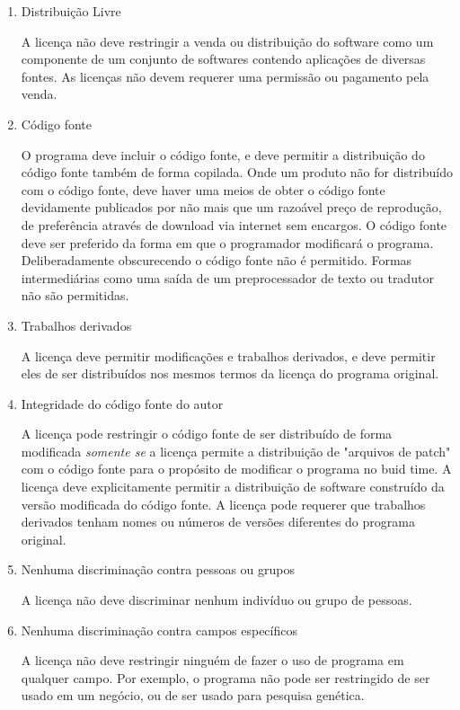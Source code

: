 \documentclass[12pt, a4paper]{report}
\begin{document}
\begin{enumerate}

  \item{Distribuição Livre}

    A licença não deve restringir a venda ou distribuição do software como um componente de um conjunto de softwares contendo aplicações de diversas fontes. As licenças não devem requerer uma permissão ou pagamento pela venda.

  \item{Código fonte}

    O programa deve incluir o código fonte, e deve permitir a distribuição do código fonte também de forma copilada. Onde um produto não for distribuído com o código fonte, deve haver uma meios de obter o código fonte devidamente publicados por não mais que um razoável preço de reprodução, de preferência através de download via internet sem encargos. O código fonte deve ser preferido da forma em que o programador modificará o programa. Deliberadamente obscurecendo o código fonte não é permitido. Formas intermediárias como uma saída de um preprocessador de texto ou tradutor não são permitidas.

  \item{Trabalhos derivados}

    A licença deve permitir modificações e trabalhos derivados, e deve permitir eles de ser distribuídos nos mesmos termos da licença do programa original.

  \item{Integridade do código fonte do autor}

    A licença pode restringir o código fonte de ser distribuído de forma modificada \emph{somente se} a licença permite a distribuição de "arquivos de patch" com o código fonte para o propósito de modificar o programa no buid time. A licença deve explicitamente permitir a distribuição de software construído da versão modificada do código fonte. A licença pode requerer que trabalhos derivados tenham nomes ou números de versões diferentes do programa original.

  \item{Nenhuma discriminação contra pessoas ou grupos}

    A licença não deve discriminar nenhum indivíduo ou grupo de pessoas.

  \item{Nenhuma discriminação contra campos específicos}

    A licença não deve restringir ninguém de fazer o uso de programa em qualquer campo. Por exemplo, o programa não pode ser restringido de ser usado em um negócio, ou de ser usado para pesquisa genética.


\end{enumerate}
\end{document}

